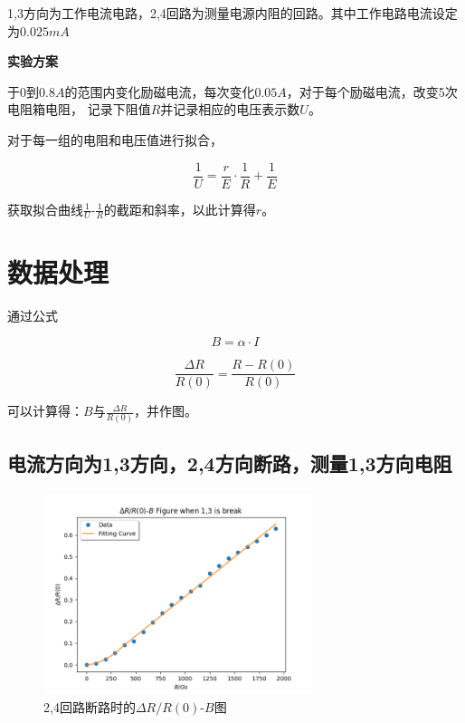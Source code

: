 \documentclass[a4paper,UTF8]{ctexart}
\begin{document}
1,3方向为工作电流电路，2,4回路为测量电源内阻的回路。其中工作电路电流设定为$0.025 mA$

{\bfseries 实验方案}

于$0$到$0.8A$的范围内变化励磁电流，每次变化$0.05A$，对于每个励磁电流，改变5次电阻箱电阻，
记录下阻值$R$并记录相应的电压表示数$U$。

对于每一组的电阻和电压值进行拟合，

\begin{equation}
    \frac{1}{U} = \frac{r}{E} \cdot \frac{1}{R} + \frac{1}{E}
\end{equation}

获取拟合曲线$\frac{1}{U}$-$\frac{1}{R}$的截距和斜率，以此计算得$r$。

\section{数据处理}

通过公式

\begin{equation}
    B = \alpha \cdot I
\end{equation}

\begin{equation}
    \frac{\Delta R}{R(0)} = \frac{R-R(0)}{R(0)}
\end{equation}

可以计算得：$B$与$\frac{\Delta R}{R(0)}$，并作图。

\subsection{电流方向为1,3方向，2,4方向断路，测量1,3方向电阻}

\begin{figure}[H]
    \centering
    \begin{minipage}[b]{0.9\textwidth}
        \centering
        \includegraphics[width=0.7\textwidth]{./fig_1.png}
        \caption{2,4回路断路时的$\Delta R/R(0)$-$B$图}
    \end{minipage}
\end{figure}
\end{document}
